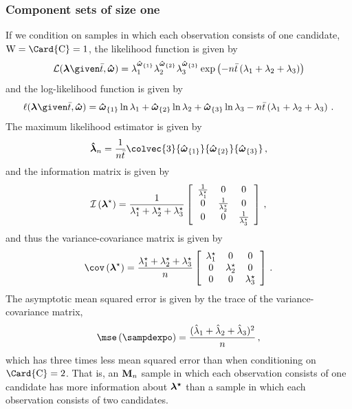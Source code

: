 \documentclass[../main.tex]{subfiles}
\begin{document}
\subsubsection{Component sets of size one}
If we condition on samples in which each observation consists of one candidate, $\RV{W} = \Card{\rvcand} = 1$, the likelihood function is given by
\begin{equation}
    \likelihood(\vec\lambda \given \bar{t}, \cntsymb) = \lambda_1^{\cnt{1}} \lambda_2^{\cnt{2}} \lambda_3^{\cnt{3}} \exp\left(-n \bar{t} \left(\lambda_1 + \lambda_2 + \lambda_3\right)\right)
\end{equation}
and the log-likelihood function is given by
\begin{equation}
    \ell(\vec\lambda \given \bar{t}, \cntsymb) = \cnt{1} \ln\lambda_1 + \cnt{2} \ln\lambda_2 + \cnt{3} \ln\lambda_3 - n \bar{t}\left(\lambda_1 + \lambda_2 + \lambda_3\right)\,.
\end{equation}
The maximum likelihood estimator is given by
\begin{equation}
    \expomle = \frac{1}{n \bar{t}} \colvec{3}
        {\cnt{1}}
        {\cnt{2}}
        {\cnt{3}}\,,
\end{equation}
and the information matrix is given by
\begin{equation}
\mathcal{I} \left ( {\boldsymbol{\lambda}}^{\star} \right ) =
\frac{1}{{\lambda}^{\star}_1 + {\lambda}^{\star}_2 + {\lambda}^{\star}_3}
\left[
\begin{array}{ccc}
    \frac{1}{{\lambda}^{\star}_1} & 0                            & 0\\
    0                            & \frac{1}{{\lambda}^{\star}_2} & 0\\
    0                            & 0                            & \frac{1}{{\lambda}^{\star}_3}
\end{array}
\right]\,,
\end{equation}
and thus the variance-covariance matrix is given by
\begin{equation}
    \cov\left(\tparam{\vec\lambda}\right) = \frac{\tparam{\lambda}_1+\tparam{\lambda}_2+\tparam{\lambda}_3}{n}
    \left[
    \begin{array}{ccc}
        \tparam{\lambda}_1 & 0                  & 0\\
        0                  & \tparam{\lambda}_2 & 0\\
        0                  & 0                  & \tparam{\lambda}_3
    \end{array}
\right]\,.
\end{equation}
The asymptotic mean squared error is given by the trace of the variance-covariance matrix,
\begin{equation}
    \mse\left(\sampdexpo\right) = \frac{(\estimator{\lambda}_1 +  \estimator{\lambda}_2 +  \estimator{\lambda}_3)^2}{n}\,,
\end{equation}
which has three times less mean squared error than when conditioning on $\Card{\rvcand} = 2$. That is, an $\mathbf{M}_n$ sample in which each observation consists of one candidate has more information about $\boldsymbol{{\lambda}^{\star}}$ than a sample in which each observation consists of two candidates.
\end{document}

